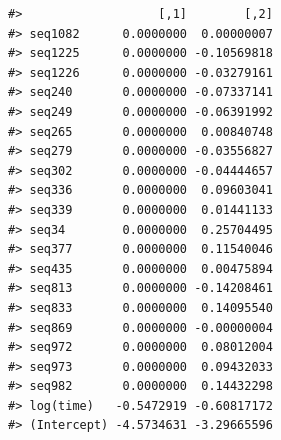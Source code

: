 \documentclass[
  12pt,
  letterpaper,
  DIV=11,
  numbers=noendperiod]{scrartcl}
\begin{document}
\begin{verbatim}
#>                   [,1]        [,2]
#> seq1082      0.0000000  0.00000007
#> seq1225      0.0000000 -0.10569818
#> seq1226      0.0000000 -0.03279161
#> seq240       0.0000000 -0.07337141
#> seq249       0.0000000 -0.06391992
#> seq265       0.0000000  0.00840748
#> seq279       0.0000000 -0.03556827
#> seq302       0.0000000 -0.04444657
#> seq336       0.0000000  0.09603041
#> seq339       0.0000000  0.01441133
#> seq34        0.0000000  0.25704495
#> seq377       0.0000000  0.11540046
#> seq435       0.0000000  0.00475894
#> seq813       0.0000000 -0.14208461
#> seq833       0.0000000  0.14095540
#> seq869       0.0000000 -0.00000004
#> seq972       0.0000000  0.08012004
#> seq973       0.0000000  0.09432033
#> seq982       0.0000000  0.14432298
#> log(time)   -0.5472919 -0.60817172
#> (Intercept) -4.5734631 -3.29665596
\end{verbatim}
\end{document}
